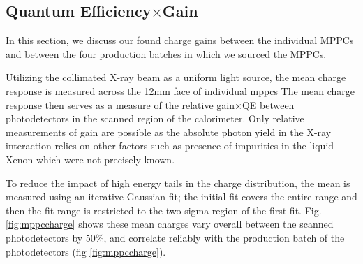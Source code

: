
\subsection{Quantum Efficiency$\times$Gain}\label{sec:qegain}

In this section, we discuss our found charge gains between the individual MPPCs and between the four production batches in which we sourced the MPPCs.

Utilizing the collimated X-ray beam as a uniform light source, the mean charge
response is measured across the 12mm face of individual mppcs 
 The mean charge response
then serves as a measure of the relative gain$\times$QE between photodetectors
in the scanned region of the calorimeter. %
Only relative measurements of gain are possible as the
absolute photon yield in the X-ray interaction relies on other factors
such as presence of impurities in the liquid Xenon which were not
precisely known. 

To reduce the impact of high energy tails
in the charge distribution, the mean is measured using an iterative Gaussian fit; the
initial fit covers the entire range and then the fit range is restricted to the two sigma
region of the first fit.  Fig. \ref{fig:mppccharge} shows these mean charges vary overall between the
scanned photodetectors by 50\%, and correlate reliably with the
production batch of the photodetectors (fig \ref{fig:mppccharge}). 


